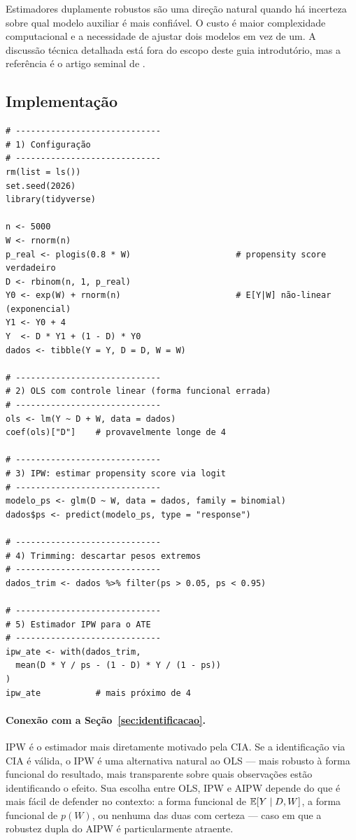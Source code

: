 Estimadores duplamente robustos são uma direção natural quando há incerteza sobre qual modelo auxiliar é mais confiável. O custo é maior complexidade computacional e a necessidade de ajustar dois modelos em vez de um. A discussão técnica detalhada está fora do escopo deste guia introdutório, mas a referência é o artigo seminal de \citet{robins1994}.

\subsection*{Implementação}

\begin{lstlisting}[caption={Estimação por IPW e comparação com OLS.}, label={lst:ipw}]
# -----------------------------
# 1) Configuração
# -----------------------------
rm(list = ls())
set.seed(2026)
library(tidyverse)

n <- 5000
W <- rnorm(n)
p_real <- plogis(0.8 * W)                     # propensity score verdadeiro
D <- rbinom(n, 1, p_real)
Y0 <- exp(W) + rnorm(n)                       # E[Y|W] não-linear (exponencial)
Y1 <- Y0 + 4
Y  <- D * Y1 + (1 - D) * Y0
dados <- tibble(Y = Y, D = D, W = W)

# -----------------------------
# 2) OLS com controle linear (forma funcional errada)
# -----------------------------
ols <- lm(Y ~ D + W, data = dados)
coef(ols)["D"]    # provavelmente longe de 4

# -----------------------------
# 3) IPW: estimar propensity score via logit
# -----------------------------
modelo_ps <- glm(D ~ W, data = dados, family = binomial)
dados$ps <- predict(modelo_ps, type = "response")

# -----------------------------
# 4) Trimming: descartar pesos extremos
# -----------------------------
dados_trim <- dados %>% filter(ps > 0.05, ps < 0.95)

# -----------------------------
# 5) Estimador IPW para o ATE
# -----------------------------
ipw_ate <- with(dados_trim,
  mean(D * Y / ps - (1 - D) * Y / (1 - ps))
)
ipw_ate           # mais próximo de 4
\end{lstlisting}

\paragraph{Conexão com a Seção~\ref{sec:identificacao}.} IPW é o estimador mais diretamente motivado pela CIA. Se a identificação via CIA é válida, o IPW é uma alternativa natural ao OLS --- mais robusto à forma funcional do resultado, mais transparente sobre quais observações estão identificando o efeito. Sua escolha entre OLS, IPW e AIPW depende do que é mais fácil de defender no contexto: a forma funcional de $\mathbb{E}[Y \mid D, W]$, a forma funcional de $p(W)$, ou nenhuma das duas com certeza --- caso em que a robustez dupla do AIPW é particularmente atraente.

